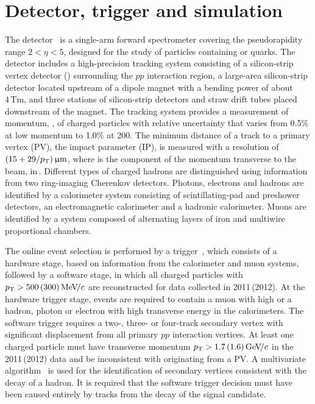 \section{Detector, trigger and simulation}
\label{sec:Detector}

The \lhcb detector~\cite{Alves:2008zz,LHCb-DP-2014-002} is a single-arm
forward spectrometer covering the \mbox{pseudorapidity} range $2<\eta <5$,
designed for the study of particles containing \bquark or \cquark quarks.
The detector includes a high-precision tracking system consisting of a
silicon-strip vertex detector (\velo) surrounding the $pp$ interaction
region, a large-area silicon-strip detector located upstream of a dipole
magnet with a bending power of about $4{\mathrm{\,Tm}}$, and three stations
of silicon-strip detectors and straw drift tubes placed downstream of the
magnet.
The tracking system provides a measurement of momentum, \ptot, of charged particles with
relative uncertainty that varies from 0.5\% at low momentum to 1.0\% at 200\gevc.
The minimum distance of a track to a primary vertex (PV), the impact parameter (IP), 
is measured with a resolution of $(15+29/p_{\mathrm{ T}}){\,\upmu\mathrm{m}}$,
where \pt is the component of the momentum transverse to the beam, in\,\gevc.
Different types of charged hadrons are distinguished using information
from two ring-imaging Cherenkov detectors.
Photons, electrons and hadrons are identified by a calorimeter system
consisting of scintillating-pad and preshower detectors, an electromagnetic
calorimeter and a hadronic calorimeter.
Muons are identified by a system composed of alternating layers of iron and
multiwire proportional chambers.

The online event selection is performed by a
trigger~\cite{LHCb-DP-2012-004}, 
which consists of a hardware stage, based on information from the calorimeter and muon
systems, followed by a software stage, in which all charged particles
with $p_{\mathrm{ T}}>500\,(300){\mathrm{\,Me\kern -0.1em V\!/}c}$ are reconstructed for data collected in 2011\,(2012).
At the hardware trigger stage, events are required to contain a muon with high
\pt or a hadron, photon or electron with high transverse energy in the
calorimeters.
The software trigger requires a two-, three- or four-track secondary vertex
with significant displacement from all primary $pp$ interaction vertices.
At least one charged particle must have transverse momentum $p_{\mathrm{ T}} >
1.7\,(1.6){\mathrm{\,Ge\kern -0.1em V\!/}c}$ in the 2011\,(2012) data and be inconsistent with
originating from a PV.
A multivariate algorithm~\cite{BBDT} is used for the identification of
secondary vertices consistent with the decay of a \bquark hadron.
It is required that the software trigger decision must have been caused
entirely by tracks from the decay of the signal \B candidate.

